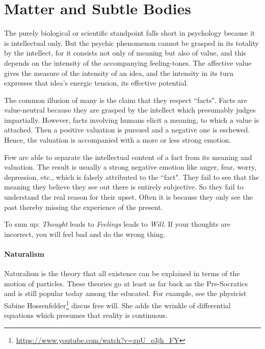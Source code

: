 \section{Matter and Subtle Bodies}

\begin{quotex}
The purely biological or scientific standpoint falls short in psychology because it is intellectual only. But the psychic phenomenon cannot be grasped in its totality by the intellect, for it consists not only of meaning but also of value, and this depends on the intensity of the accompanying feeling-tones. The affective value gives the measure of the intensity of an idea, and the intensity in its turn expresses that idea's energic tension, its effective potential. 

\end{quotex}
The common illusion of many is the claim that they respect ``facts". Facts are value-neutral because they are grasped by the intellect which presumably judges impartially. However, facts involving humans elicit a meaning, to which a value is attached. Then a positive valuation is pursued and a negative one is eschewed. Hence, the valuation is accompanied with a more or less strong emotion.

Few are able to separate the intellectual content of a fact from its meaning and valuation. The result is usually a strong negative emotion like anger, fear, worry, depression, etc., which is falsely attributed to the ``fact". They fail to see that the meaning they believe they see out there is entirely subjective. So they fail to understand the real reason for their upset. Often it is because they only see the past thereby missing the experience of the present.

To sum up: \emph{Thought} leads to \emph{Feelings} leads to \emph{Will}. If your thoughts are incorrect, you will feel bad and do the wrong thing.

\paragraph{Naturalism}
Naturalism is the theory that all existence can be explained in terms of the motion of particles. These theories go at least as far back as the Pre-Socratics and is still popular today among the educated. For example, see the physicist Sabine Hossenfelder\footnote{\url{https://www.youtube.com/watch?v=zpU_e3jh_FY}} discus free will. She adds the wrinkle of differential equations which presumes that reality is continuous.

